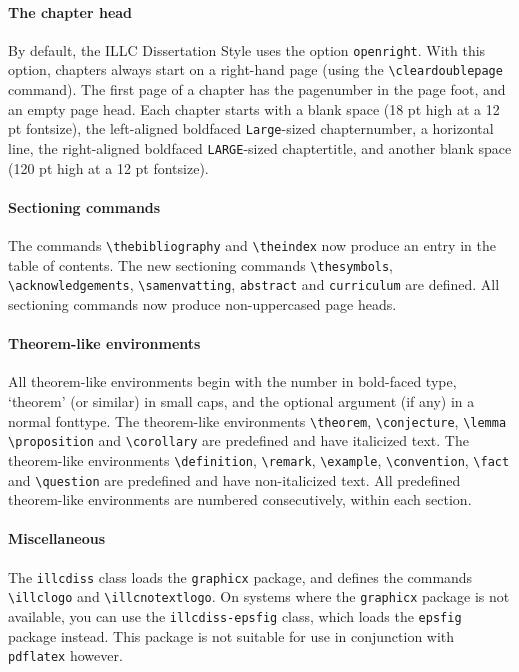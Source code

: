 \paragraph*{The chapter head}
By default, the ILLC Dissertation Style uses the option \verb|openright|.
With this option, chapters always start on a right-hand page
(using the \verb|\cleardoublepage| command).
The first page of a chapter has the pagenumber in the page foot,
and an empty page head.
Each chapter starts with
a blank space (18 pt high at a 12 pt fontsize),
the left-aligned boldfaced \verb|Large|-sized chapternumber,
a horizontal line,
the right-aligned boldfaced \verb|LARGE|-sized chaptertitle,
and another blank space (120 pt high at a 12 pt fontsize).

\paragraph*{Sectioning commands}
The commands \verb|\thebibliography| and \verb|\theindex| now
produce an entry in the table of contents.
The new sectioning commands \verb|\thesymbols|, \verb|\acknowledgements|,
\verb|\samenvatting|, \verb|abstract| and \verb|curriculum| are defined.
All sectioning commands now produce non-uppercased page heads.

\paragraph*{Theorem-like environments}
All theorem-like environments begin with the number in bold-faced type,
`theorem' (or similar) in small caps,
and the optional argument (if any) in a normal fonttype.
The theorem-like environments
\verb|\theorem|,
\verb|\conjecture|,
\verb|\lemma|
\verb|\proposition| and
\verb|\corollary|
are predefined and have italicized text.
The theorem-like environments
\verb|\definition|,
\verb|\remark|,
\verb|\example|,
\verb|\convention|,
\verb|\fact| and
\verb|\question|
are predefined and have non-italicized text.
All predefined theorem-like environments are numbered consecutively,
within each section.

\paragraph*{Miscellaneous}
The \verb|illcdiss| class loads the \verb|graphicx| package,
and defines the commands 
\verb|\illclogo| and \verb|\illcnotextlogo|.
On systems where the \verb|graphicx| package is not available, you
can use the \verb|illcdiss-epsfig| class, which loads the
\verb|epsfig| package instead. This package is not suitable for
use in conjunction with \verb|pdflatex| however.

